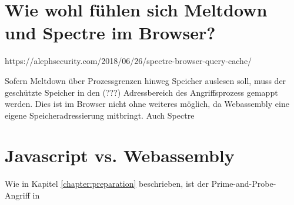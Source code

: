 \section{Wie wohl fühlen sich Meltdown und Spectre im Browser?}
\label{MeltdownSpectreBrowser}

https://alephsecurity.com/2018/06/26/spectre-browser-query-cache/
\cite{OvercomingSpectreBrowserMitigations}

Sofern Meltdown über Prozessgrenzen hinweg Speicher auslesen soll, muss der geschützte Speicher in den (???) Adressbereich des Angriffsprozess gemappt werden.
Dies ist im Browser nicht ohne weiteres möglich, da Webassembly eine eigene Speicheradressierung mitbringt.
Auch Spectre



\section{Javascript vs. Webassembly}

Wie in Kapitel \ref{chapter:preparation} beschrieben, ist der Prime-and-Probe-Angriff in 

